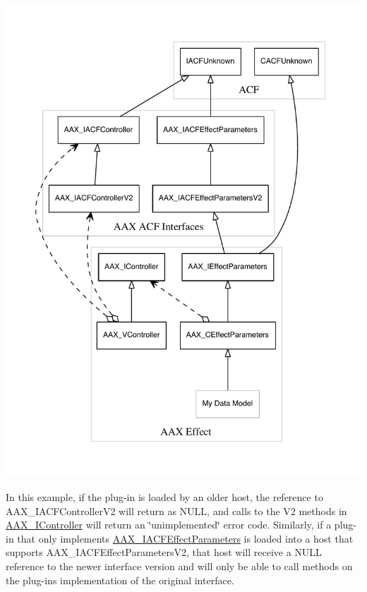 \begin{DoxyImage}
\includegraphics[width=\textwidth,height=\textheight/2,keepaspectratio=true]{dot_aax_acf_versioning_plug-in_v2}
\caption{Adding a new version to A\+A\+X\+\_\+\+I\+A\+C\+F\+Effect\+Parameters and A\+A\+X\+\_\+\+I\+A\+C\+F\+Controller}
\end{DoxyImage}
 In this example, if the plug-\/in is loaded by an older host, the reference to {\ttfamily A\+A\+X\+\_\+\+I\+A\+C\+F\+Controller\+V2} will return as {\ttfamily N\+U\+L\+L}, and calls to the V2 methods in \hyperlink{a00090}{A\+A\+X\+\_\+\+I\+Controller} will return an \char`\"{}unimplemented\char`\"{} error code. Similarly, if a plug-\/in that only implements \hyperlink{a00061}{A\+A\+X\+\_\+\+I\+A\+C\+F\+Effect\+Parameters} is loaded into a host that supports {\ttfamily A\+A\+X\+\_\+\+I\+A\+C\+F\+Effect\+Parameters\+V2}, that host will receive a {\ttfamily N\+U\+L\+L} reference to the newer interface version and will only be able to call methods on the plug-\/in\textquotesingle{}s implementation of the original interface.

